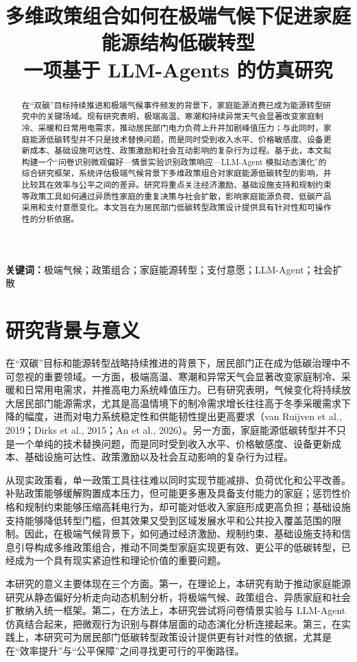 \documentclass[12pt,a4paper]{ctexart}
\title{\heiti 多维政策组合如何在极端气候下促进家庭能源结构低碳转型\\
\large 一项基于 LLM-Agents 的仿真研究}
\author{}
\date{}
\begin{document}
\maketitle

\begin{abstract}
在“双碳”目标持续推进和极端气候事件频发的背景下，家庭能源消费已成为能源转型研究中的关键场域。现有研究表明，极端高温、寒潮和持续异常天气会显著改变家庭制冷、采暖和日常用电需求，推动居民部门电力负荷上升并加剧峰值压力；与此同时，家庭能源低碳转型并不只是技术替换问题，而是同时受到收入水平、价格敏感度、设备更新成本、基础设施可达性、政策激励和社会互动影响的复杂行为过程。基于此，本文拟构建一个“问卷识别微观偏好—情景实验识别政策响应—LLM-Agent 模拟动态演化”的综合研究框架，系统评估极端气候背景下多维政策组合对家庭能源低碳转型的影响，并比较其在效率与公平之间的差异。研究将重点关注经济激励、基础设施支持和规制约束等政策工具如何通过异质性家庭的重复决策与社会扩散，影响家庭能源负荷、低碳产品采用和支付意愿变化。本文旨在为居民部门低碳转型政策设计提供具有针对性和可操作性的分析依据。
\end{abstract}

\noindent\textbf{关键词：}极端气候；政策组合；家庭能源转型；支付意愿；LLM-Agent；社会扩散

\section{研究背景与意义}
在“双碳”目标和能源转型战略持续推进的背景下，居民部门正在成为低碳治理中不可忽视的重要领域。一方面，极端高温、寒潮和异常天气会显著改变家庭制冷、采暖和日常用电需求，并推高电力系统峰值压力。已有研究表明，气候变化将持续放大居民部门能源需求，尤其是高温情境下的制冷需求增长往往高于冬季采暖需求下降的幅度，进而对电力系统稳定性和供能韧性提出更高要求（van Ruijven et al., 2019；Dirks et al., 2015；An et al., 2026）。另一方面，家庭能源低碳转型并不只是一个单纯的技术替换问题，而是同时受到收入水平、价格敏感度、设备更新成本、基础设施可达性、政策激励以及社会互动影响的复杂行为过程。

从现实政策看，单一政策工具往往难以同时实现节能减排、负荷优化和公平改善。补贴政策能够缓解购置成本压力，但可能更多惠及具备支付能力的家庭；惩罚性价格和规制约束能够压缩高耗电行为，却可能对低收入家庭形成更高负担；基础设施支持能够降低转型门槛，但其效果又受到区域发展水平和公共投入覆盖范围的限制。因此，在极端气候背景下，如何通过经济激励、规制约束、基础设施支持和信息引导构成多维政策组合，推动不同类型家庭实现更有效、更公平的低碳转型，已经成为一个具有现实紧迫性和理论价值的重要问题。

本研究的意义主要体现在三个方面。第一，在理论上，本研究有助于推动家庭能源研究从静态偏好分析走向动态机制分析，将极端气候、政策组合、异质家庭和社会扩散纳入统一框架。第二，在方法上，本研究尝试将问卷情景实验与 LLM-Agent 仿真结合起来，把微观行为识别与群体层面的动态演化分析连接起来。第三，在实践上，本研究可为居民部门低碳转型政策设计提供更有针对性的依据，尤其是在“效率提升”与“公平保障”之间寻找更可行的平衡路径。
\end{document}

